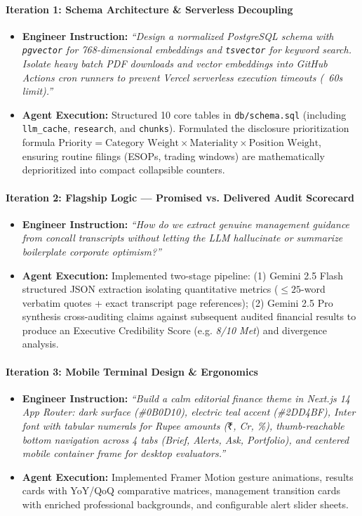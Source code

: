 \paragraph{Iteration 1: Schema Architecture \& Serverless Decoupling}
\begin{itemize}
    \item \textbf{Engineer Instruction:} \textit{``Design a normalized PostgreSQL schema with \texttt{pgvector} for 768-dimensional embeddings and \texttt{tsvector} for keyword search. Isolate heavy batch PDF downloads and vector embeddings into GitHub Actions cron runners to prevent Vercel serverless execution timeouts (~60s limit).''}
    \item \textbf{Agent Execution:} Structured 10 core tables in \texttt{db/schema.sql} (including \texttt{llm\_cache}, \texttt{research}, and \texttt{chunks}). Formulated the disclosure prioritization formula $\text{Priority} = \text{Category Weight} \times \text{Materiality} \times \text{Position Weight}$, ensuring routine filings (ESOPs, trading windows) are mathematically deprioritized into compact collapsible counters.
\end{itemize}

\paragraph{Iteration 2: Flagship Logic --- Promised vs. Delivered Audit Scorecard}
\begin{itemize}
    \item \textbf{Engineer Instruction:} \textit{``How do we extract genuine management guidance from concall transcripts without letting the LLM hallucinate or summarize boilerplate corporate optimism?''}
    \item \textbf{Agent Execution:} Implemented two-stage pipeline: (1) Gemini 2.5 Flash structured JSON extraction isolating quantitative metrics ($\le 25$-word verbatim quotes + exact transcript page references); (2) Gemini 2.5 Pro synthesis cross-auditing claims against subsequent audited financial results to produce an Executive Credibility Score (e.g. \textit{8/10 Met}) and divergence analysis.
\end{itemize}

\paragraph{Iteration 3: Mobile Terminal Design \& Ergonomics}
\begin{itemize}
    \item \textbf{Engineer Instruction:} \textit{``Build a calm editorial finance theme in Next.js 14 App Router: dark surface (\#0B0D10), electric teal accent (\#2DD4BF), Inter font with tabular numerals for Rupee amounts ($\text{₹}$, Cr, \%), thumb-reachable bottom navigation across 4 tabs (Brief, Alerts, Ask, Portfolio), and centered mobile container frame for desktop evaluators.''}
    \item \textbf{Agent Execution:} Implemented Framer Motion gesture animations, results cards with YoY/QoQ comparative matrices, management transition cards with enriched professional backgrounds, and configurable alert slider sheets.
\end{itemize}

